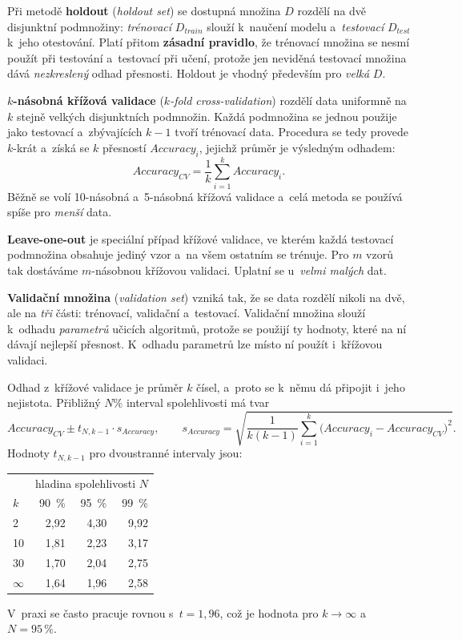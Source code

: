 \documentclass[11pt,a4paper]{article}
\theoremstyle{definition}
\begin{document}
\begin{defbox}
Při metodě \textbf{holdout} (\emph{holdout set}) se dostupná množina $D$ rozdělí na dvě
disjunktní podmnožiny: \emph{trénovací} $D_{train}$ slouží k~naučení modelu a~\emph{testovací}
$D_{test}$ k~jeho otestování. Platí přitom \textbf{zásadní pravidlo}, že trénovací množina se
nesmí použít při testování a~testovací při učení, protože jen neviděná testovací množina dává
\emph{nezkreslený} odhad přesnosti. Holdout je vhodný především pro \emph{velká} $D$.

\textbf{$k$-násobná křížová validace} (\emph{$k$-fold cross-validation}) rozdělí data uniformně
na $k$ stejně velkých disjunktních podmnožin. Každá podmnožina se jednou použije jako testovací
a~zbývajících $k-1$ tvoří trénovací data. Procedura se tedy provede $k$-krát a~získá se $k$
přesností $\mathit{Accuracy}_i$, jejichž průměr je výsledným odhadem:
\[ \mathit{Accuracy}_{CV}=\frac1k\sum_{i=1}^{k}\mathit{Accuracy}_i. \]
Běžně se volí 10-násobná a~5-násobná křížová validace a~celá metoda se používá spíše pro
\emph{menší} data.

\textbf{Leave-one-out} je speciální případ křížové validace, ve kterém každá testovací
podmnožina obsahuje jediný vzor a~na všem ostatním se trénuje. Pro $m$ vzorů tak dostáváme $m$-násobnou
křížovou validaci. Uplatní se u~\emph{velmi malých} dat.

\textbf{Validační množina} (\emph{validation set}) vzniká tak, že se data rozdělí nikoli na dvě,
ale na \emph{tři} části: trénovací, validační a~testovací. Validační množina slouží k~odhadu
\emph{parametrů} učicích algoritmů, protože se použijí ty hodnoty, které na ní dávají nejlepší
přesnost. K~odhadu parametrů lze místo ní použít i~křížovou validaci.
\end{defbox}

\begin{defbox}
Odhad z~křížové validace je průměr $k$ čísel, a~proto se k~němu dá připojit i~jeho nejistota.
Přibližný $N\%$ interval spolehlivosti má tvar
\[ \mathit{Accuracy}_{CV}\pm t_{N,k-1}\cdot s_{\mathit{Accuracy}},\qquad
   s_{\mathit{Accuracy}}=\sqrt{\frac{1}{k(k-1)}\sum_{i=1}^{k}
   \big(\mathit{Accuracy}_i-\mathit{Accuracy}_{CV}\big)^2}. \]
Hodnoty $t_{N,k-1}$ pro dvoustranné intervaly jsou:
\begin{center}
\small
\begin{tabular}{@{}lrrr@{}}
\toprule
& \multicolumn{3}{c}{hladina spolehlivosti $N$} \\
$k$ & 90~\% & 95~\% & 99~\% \\
\midrule
2 & 2,92 & 4,30 & 9,92 \\
10 & 1,81 & 2,23 & 3,17 \\
30 & 1,70 & 2,04 & 2,75 \\
$\infty$ & 1,64 & 1,96 & 2,58 \\
\bottomrule
\end{tabular}
\end{center}
V~praxi se často pracuje rovnou s~$t=1{,}96$, což je hodnota pro $k\to\infty$ a~$N=95\,\%$.
\end{defbox}
\end{document}
